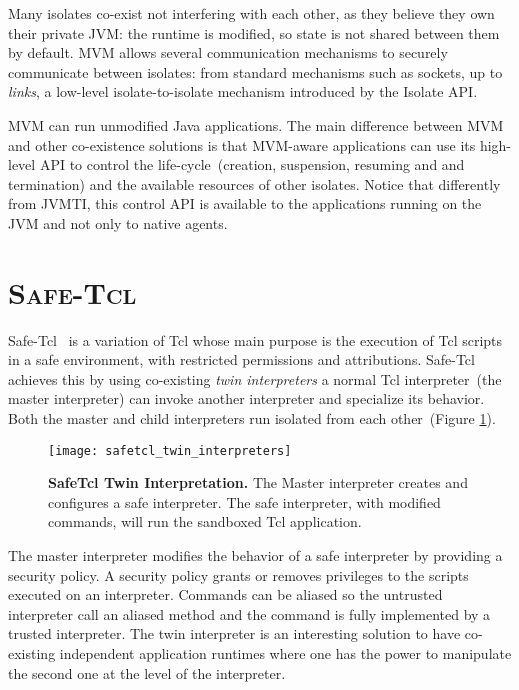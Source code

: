 Many isolates co-exist not interfering with each other, as they believe they own their private JVM: the runtime is modified, so state is not shared between them by default. MVM allows several communication mechanisms to securely communicate between isolates: from standard mechanisms such as sockets, up to \emph{links}, a low-level isolate-to-isolate mechanism introduced by the Isolate API.

MVM can run unmodified Java applications. The main difference between MVM and other co-existence solutions is that MVM-aware applications can use its high-level API to control the life-cycle~(\eg creation, suspension, resuming and and termination) and the available resources of other isolates. Notice that differently from JVMTI, this control API is available to the applications running on the JVM and not only to native agents.

\section*{\textsc{Safe-Tcl}}
Safe-Tcl~\cite{Levy97a, Bore94a} is a variation of Tcl whose main purpose is the execution of Tcl scripts in a safe environment, with restricted permissions and attributions. Safe-Tcl achieves this by using co-existing \emph{twin interpreters} \ie a normal Tcl interpreter~(the master interpreter) can invoke another interpreter and specialize its behavior. Both the master and child interpreters run isolated from each other~(Figure \ref{fig:safetcl_twin_interpreters}).

\begin{figure}[ht]
\begin{center}
\texttt{[image: safetcl\_twin\_interpreters]}
\caption{\textbf{SafeTcl Twin Interpretation.} The Master interpreter creates and configures a safe interpreter. The safe interpreter, with modified commands, will run the sandboxed Tcl application.\label{fig:safetcl_twin_interpreters}
 }
\end{center}
\end{figure}

The master interpreter modifies the behavior of a safe interpreter by providing a security policy. A security policy grants or removes privileges to the scripts executed on an interpreter. Commands can be aliased so the untrusted interpreter call an aliased method and the command is fully implemented by a trusted interpreter. The twin interpreter is an interesting solution to have co-existing independent application runtimes where one has the power to manipulate the second one at the level of the interpreter.

